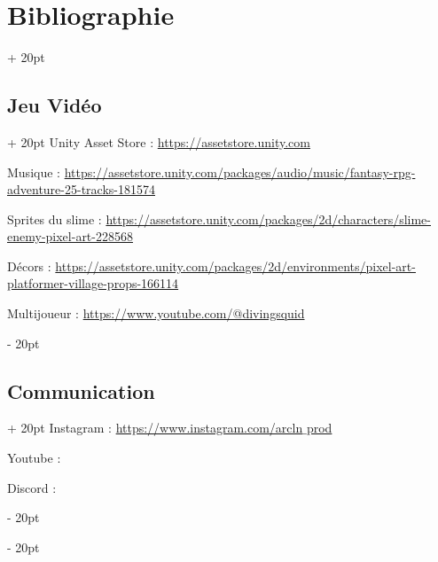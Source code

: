 \documentclass[a4paper, 12pt, twoside]{article}
\newcommand{\ind}[1][20pt]{\advance\leftskip + #1}
\newcommand{\deind}[1][20pt]{\advance\leftskip - #1}
\newenvironment{indt}[2][20pt]{#2 \par \ind[#1]}{\par \deind} %
\begin{document}
    \newpage

    \begin{indt}{\section{Bibliographie}}

        \begin{indt}{\subsection{Jeu Vidéo}}
            Unity Asset Store : \href{url}{https://assetstore.unity.com}
            
            Musique : \href{url}{https://assetstore.unity.com/packages/audio/music/fantasy-rpg-adventure-25-tracks-181574}

            Sprites du slime : \href{url}{https://assetstore.unity.com/packages/2d/characters/slime-enemy-pixel-art-228568}

            Décors : \href{url}{https://assetstore.unity.com/packages/2d/environments/pixel-art-platformer-village-props-166114}
        
            Multijoueur : \href{url}{https://www.youtube.com/@divingsquid}


        \end{indt}

        \begin{indt}{\subsection{Communication}}
            Instagram : \href{url}{https://www.instagram.com/arcln$\_$prod}

            Youtube :

            Discord :
        \end{indt}
    \end{indt}
\end{document}
